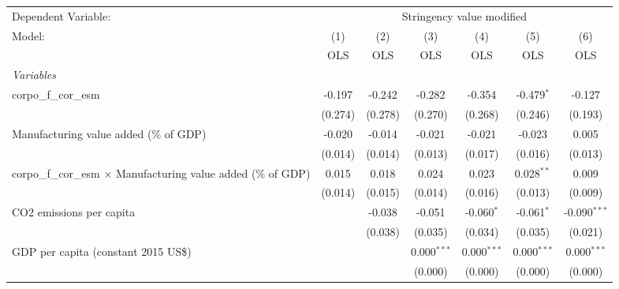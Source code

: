 
\begingroup
\centering
\begin{tabular}{lcccccc}
   \toprule
   Dependent Variable: & \multicolumn{6}{c}{Stringency value modified}\\
   Model:                                                                 & (1)     & (2)     & (3)           & (4)           & (5)           & (6)\\  
                                                                          &  OLS    & OLS     & OLS           & OLS           & OLS           & OLS\\  
   \midrule
   \emph{Variables}\\
   corpo\_f\_cor\_esm                                                     & -0.197  & -0.242  & -0.282        & -0.354        & -0.479$^{*}$  & -0.127\\   
                                                                          & (0.274) & (0.278) & (0.270)       & (0.268)       & (0.246)       & (0.193)\\   
   Manufacturing value added (\% of GDP)                                  & -0.020  & -0.014  & -0.021        & -0.021        & -0.023        & 0.005\\   
                                                                          & (0.014) & (0.014) & (0.013)       & (0.017)       & (0.016)       & (0.013)\\   
   corpo\_f\_cor\_esm $\times$ Manufacturing value added (\% of GDP)      & 0.015   & 0.018   & 0.024         & 0.023         & 0.028$^{**}$  & 0.009\\   
                                                                          & (0.014) & (0.015) & (0.014)       & (0.016)       & (0.013)       & (0.009)\\   
   CO2 emissions per capita                                               &         & -0.038  & -0.051        & -0.060$^{*}$  & -0.061$^{*}$  & -0.090$^{***}$\\   
                                                                          &         & (0.038) & (0.035)       & (0.034)       & (0.035)       & (0.021)\\   
   GDP per capita (constant 2015 US\$)                                    &         &         & 0.000$^{***}$ & 0.000$^{***}$ & 0.000$^{***}$ & 0.000$^{***}$\\   
                                                                          &         &         & (0.000)       & (0.000)       & (0.000)       & (0.000)\\   

\end{tabular}
